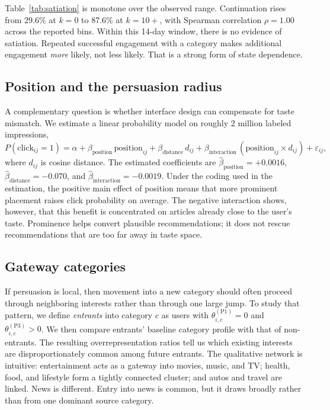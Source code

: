 \documentclass[11pt]{article}
\begin{document}
Table~\ref{tab:satiation} is monotone over the observed range. Continuation rises from 29.6\% at $k=0$ to 87.6\% at $k=10+$, with Spearman correlation $\rho = 1.00$ across the reported bins. Within this 14-day window, there is no evidence of satiation. Repeated successful engagement with a category makes additional engagement \emph{more} likely, not less likely. That is a strong form of state dependence.

\subsection{Position and the persuasion radius}

A complementary question is whether interface design can compensate for taste mismatch. We estimate a linear probability model on roughly 2 million labeled impressions,
\[
P(\text{click}_{ij}=1)
=
\alpha
+
\beta_{\text{position}}\,\text{position}_{ij}
+
\beta_{\text{distance}}\,d_{ij}
+
\beta_{\text{interaction}}\,(\text{position}_{ij}\times d_{ij})
+
\varepsilon_{ij},
\]
where $d_{ij}$ is cosine distance. The estimated coefficients are $\hat\beta_{\text{position}} = +0.0016$, $\hat\beta_{\text{distance}} = -0.070$, and $\hat\beta_{\text{interaction}} = -0.0019$. Under the coding used in the estimation, the positive main effect of position means that more prominent placement raises click probability on average. The negative interaction shows, however, that this benefit is concentrated on articles already close to the user's taste. Prominence helps convert plausible recommendations; it does not rescue recommendations that are too far away in taste space.

\subsection{Gateway categories}

If persuasion is local, then movement into a new category should often proceed through neighboring interests rather than through one large jump. To study that pattern, we define \emph{entrants} into category $c$ as users with $\theta_{i,c}^{(\mathrm{P1})}=0$ and $\theta_{i,c}^{(\mathrm{P3})}>0$. We then compare entrants' baseline category profile with that of non-entrants. The resulting overrepresentation ratios tell us which existing interests are disproportionately common among future entrants. The qualitative network is intuitive: entertainment acts as a gateway into movies, music, and TV; health, food, and lifestyle form a tightly connected cluster; and autos and travel are linked. News is different. Entry into news is common, but it draws broadly rather than from one dominant source category.
\end{document}
